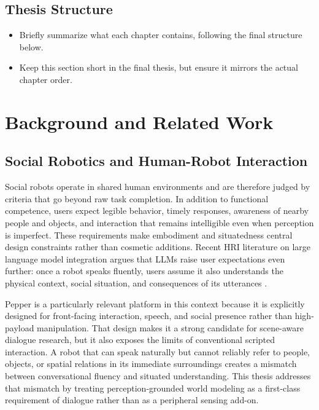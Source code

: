 \documentclass[
  digital,     %
  oneside,     %
  nosansbold,  %
  nocolorbold, %
  lof,         %
  lot,         %
]{fithesis4}
\begin{document}
\section{Thesis Structure}
\begin{itemize}
    \item Briefly summarize what each chapter contains, following the final structure below.
    \item Keep this section short in the final thesis, but ensure it mirrors the actual chapter order.
\end{itemize}

\chapter{Background and Related Work}

\section{Social Robotics and Human-Robot Interaction}
Social robots operate in shared human environments and are therefore judged by criteria that go beyond raw task completion. In addition to functional competence, users expect legible behavior, timely responses, awareness of nearby people and objects, and interaction that remains intelligible even when perception is imperfect. These requirements make embodiment and situatedness central design constraints rather than cosmetic additions. Recent HRI literature on large language model integration argues that LLMs raise user expectations even further: once a robot speaks fluently, users assume it also understands the physical context, social situation, and consequences of its utterances \cite{kim_understanding_2024, atuhurra_leveraging_2024}.

Pepper is a particularly relevant platform in this context because it is explicitly designed for front-facing interaction, speech, and social presence rather than high-payload manipulation. That design makes it a strong candidate for scene-aware dialogue research, but it also exposes the limits of conventional scripted interaction. A robot that can speak naturally but cannot reliably refer to people, objects, or spatial relations in its immediate surroundings creates a mismatch between conversational fluency and situated understanding. This thesis addresses that mismatch by treating perception-grounded world modeling as a first-class requirement of dialogue rather than as a peripheral sensing add-on.
\end{document}
